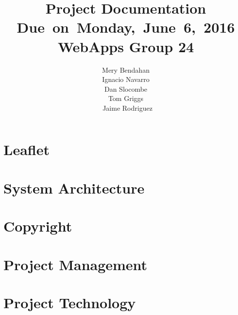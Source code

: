 \documentclass{article}
\title{
\vspace{2in}
\textmd{\textbf{Project Documentation}}\\
\normalsize\vspace{0.1in}\small{Due\ on\ Monday,\ June\ 6,\ 2016}\\
\vspace{0.1in}\large{\textbf{WebApps Group 24}}
\vspace{3in}
}
\author{Mery Bendahan \\ Ignacio Navarro \\ Dan Slocombe \\ Tom Griggs \\ Jaime Rodriguez}
\date{}
\renewcommand{\_}{\char`_}
\begin{document}
\maketitle
\newpage


\section{Leaflet}

\section{System Architecture}

\section{Copyright}

\section{Project Management}

\section{Project Technology}



\end{document}
